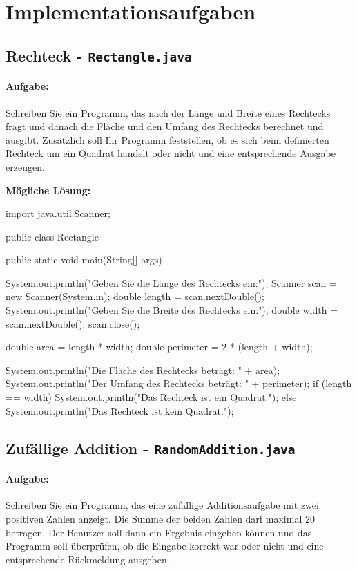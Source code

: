 \documentclass[a4paper,10pt, dvipsnames]{report}
\begin{document}
\section{Implementationsaufgaben}

\subsection{Rechteck - \texttt{Rectangle.java}}

\paragraph{Aufgabe:}
Schreiben Sie ein Programm, das nach der Länge und Breite eines Rechtecks fragt und danach die Fläche und den Umfang des Rechtecks berechnet und ausgibt. Zusätzlich soll Ihr Programm feststellen, ob es sich beim definierten Rechteck um ein Quadrat handelt oder nicht und eine entsprechende Ausgabe erzeugen.

\textbf{Mögliche Lösung:}

\begin{javacodebox}
import java.util.Scanner;

public class Rectangle {
    public static void main(String[] args) {
        
        System.out.println("Geben Sie die Länge des Rechtecks ein:");
        Scanner scan = new Scanner(System.in);
        double length = scan.nextDouble();
        System.out.println("Geben Sie die Breite des Rechtecks ein:");
        double width = scan.nextDouble();
        scan.close();

        double area = length * width;
        double perimeter = 2 * (length + width);

        System.out.println("Die Fläche des Rechtecks beträgt: " + area);
        System.out.println("Der Umfang des Rechtecks beträgt: " + perimeter);
        if (length == width) {
            System.out.println("Das Rechteck ist ein Quadrat.");
        } else {
            System.out.println("Das Rechteck ist kein Quadrat.");
        }
    }
}
\end{javacodebox}

\subsection{Zufällige Addition - \texttt{RandomAddition.java}}

\paragraph{Aufgabe:}
Schreiben Sie ein Programm, das eine zufällige Additionsaufgabe mit zwei positiven Zahlen anzeigt. Die Summe der beiden Zahlen darf maximal 20 betragen. Der Benutzer soll dann ein Ergebnis eingeben können und das Programm soll überprüfen, ob die Eingabe korrekt war oder nicht und eine entsprechende Rückmeldung ausgeben.
\end{document}
